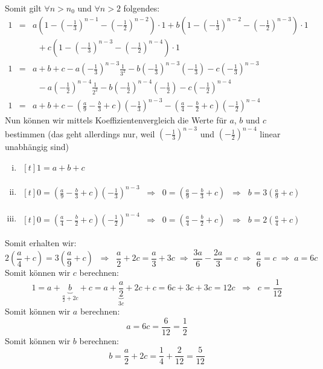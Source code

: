 \begin{uebsp}
\begin{Answer}
\begin{enumerate}[a)]
        Somit gilt $\forall n>n_0$ und $\forall n>2$ folgendes:
        \begin{eqnarray*}
            1&=&a\left(1-\left(-\frac{1}{3}\right)^{n-1}-\left(-\frac{1}{2}\right)^{n-2}\right)\cdot 1
                +b\left(1-\left(-\frac{1}{3}\right)^{n-2}-\left(-\frac{1}{2}\right)^{n-3}\right)\cdot 1\\
                &&\;\;+c\left(1-\left(-\frac{1}{3}\right)^{n-3}-\left(-\frac{1}{2}\right)^{n-4}\right)\cdot
                1\\
            1&=&a+b+c-a\left(-\frac{1}{3}\right)^{n-3}\frac{1}{3^2}-b\left(-\frac{1}{3}\right)^{n-3}\left(-\frac{1}{3}\right)-c\left(-\frac{1}{3}\right)^{n-3}\\
            &&\;\;-a\left(-\frac{1}{2}\right)^{n-4}\frac{1}{2^2}-b\left(-\frac{1}{2}\right)^{n-4}\left(-\frac{1}{2}\right)-c\left(-\frac{1}{2}\right)^{n-4}\\
            1&=&a+b+c-\left(\frac{a}{9}-\frac{b}{3}+c\right)\left(-\frac{1}{3}\right)^{n-3}
                -\left(\frac{a}{4}-\frac{b}{2}+c\right)\left(-\frac{1}{2}\right)^{n-4}
        \end{eqnarray*}
        Nun können wir mittels Koeffizientenvergleich die Werte für $a$, $b$ und
        $c$ bestimmen (das geht allerdings nur, weil
        $\left(-\frac{1}{3}\right)^{n-3}$ und $\left(-\frac{1}{2}\right)^{n-4}$
        linear unabhängig sind)
        \begin{enumerate}[i)]
            \item $\begin{aligned}[t]1=a+b+c\end{aligned}$
            \item $\begin{aligned}[t]0=\left(\frac{a}{9}-\frac{b}{3}+c\right)\left(-\frac{1}{3}\right)^{n-3}\;\;\Rightarrow\;\;
                0=\left(\frac{a}{9}-\frac{b}{3}+c\right)\;\;\Rightarrow\;\;
                b=3\left(\frac{a}{9}+c\right)\end{aligned}$
            \item
            $\begin{aligned}[t]0=\left(\frac{a}{4}-\frac{b}{2}+c\right)\left(-\frac{1}{2}\right)^{n-4}\;\;\Rightarrow\;\;
                0=\left(\frac{a}{4}-\frac{b}{2}+c\right)\;\;\Rightarrow\;\;
                b=2\left(\frac{a}{4}+c\right)\end{aligned}$
        \end{enumerate}
        Somit erhalten wir:
        \[
            2\left(\frac{a}{4}+c\right)=3\left(\frac{a}{9}+c\right)\;\;\Rightarrow\;\;
            \frac{a}{2}+2c=\frac{a}{3}+3c\;\Rightarrow\;
            \frac{3a}{6}-\frac{2a}{3}=c\;\Rightarrow\;
            \frac{a}{6}=c\;\Rightarrow\;a=6c
        \]
        Somit können wir $c$ berechnen:
        \[1=a+\underbrace{b}_{\frac{a}{2}+2c}+c=a+\underbrace{\frac{a}{2}}_{3c}+2c+c=6c+3c+3c=12c\;\;\Rightarrow\;\;c=\frac{1}{12}\]
        Somit können wir $a$ berechnen:
        \[a=6c=\frac{6}{12}=\frac{1}{2}\]
        Somit können wir $b$ berechnen:
        \[b=\frac{a}{2}+2c=\frac{1}{4}+\frac{2}{12}=\frac{5}{12}\]


\end{enumerate}
\end{Answer}
\end{uebsp}
